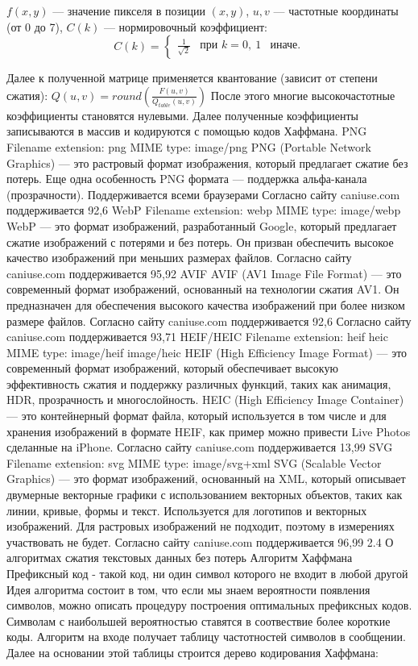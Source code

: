 \documentclass[12pt]{article}
\begin{document}
$f(x,y)$ — значение пикселя в позиции $(x,y)$,
$u,v$ — частотные координаты (от 0 до 7),
$C(k)$ — нормировочный коэффициент:
$$
C(k) = \begin{cases}
\frac{1}{\sqrt{2}} & \text{при } k=0, \
1 & \text{иначе}.
\end{cases}
$$

Далее к полученной матрице применяется квантование (зависит от степени сжатия):
$
Q(u, v) = round(\frac{F(u, v)}{Q_{table}(u, v)})
$
После этого многие высокочастотные коэффициенты становятся нулевыми.
Далее полученные коэффициенты записываются в массив и кодируются с помощью кодов Хаффмана.
PNG
Filename extension: png
MIME type: image/png
PNG (Portable Network Graphics) — это растровый формат изображения, который предлагает сжатие без потерь. Еще одна особенность PNG формата — поддержка альфа-канала (прозрачности). Поддерживается всеми браузерами
Согласно сайту caniuse.com поддерживается 92,6%
WebP
Filename extension: webp
MIME type: image/webp
WebP — это формат изображений, разработанный Google, который предлагает сжатие изображений с потерями и без потерь. Он призван обеспечить высокое качество изображений при меньших размерах файлов.
Согласно сайту caniuse.com поддерживается 95,92%
AVIF
AVIF (AV1 Image File Format) — это современный формат изображений, основанный на технологии сжатия AV1. Он предназначен для обеспечения высокого качества изображений при более низком размере файлов. Согласно сайту caniuse.com поддерживается 92,6%
Согласно сайту caniuse.com поддерживается 93,71%
HEIF/HEIC
Filename extension: heif heic
MIME type: image/heif image/heic
HEIF (High Efficiency Image Format) — это современный формат изображений, который обеспечивает высокую эффективность сжатия и поддержку различных функций, таких как анимация, HDR, прозрачность и многослойность.
HEIC (High Efficiency Image Container) — это контейнерный формат файла, который используется в том числе и для хранения изображений в формате HEIF, как пример можно привести Live Photos сделанные на iPhone.
Согласно сайту caniuse.com поддерживается 13,99%
SVG
Filename extension: svg
MIME type: image/svg+xml
SVG (Scalable Vector Graphics) — это формат изображений, основанный на XML, который описывает двумерные векторные графики с использованием векторных объектов, таких как линии, кривые, формы и текст. Используется для логотипов и векторных изображений. Для растровых изображений не подходит, поэтому в измерениях участвовать не будет. 
Согласно сайту caniuse.com поддерживается 96,99%
2.4 О алгоритмах сжатия текстовых данных без потерь
Алгоритм Хаффмана
Префиксный код - такой код, ни один символ которого не входит в любой другой
Идея алгоритма состоит в том, что если мы знаем вероятности появления символов, можно описать процедуру построения оптимальных префиксных кодов. Символам с наибольшей вероятностью ставятся в соотвествие более короткие коды.
Алгоритм на входе получает таблицу частотностей символов в сообщении. Далее на основании этой таблицы строится дерево кодирования Хаффмана:
\end{document}
